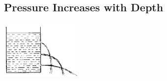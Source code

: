 \begin{multicols}{2}
%
%

\subsection{Pressure Increases with Depth}

\begin{center}
\includegraphics[width=0.3\textwidth]{./img/source/pressure-depth.png}
\end{center}


\end{multicols}
